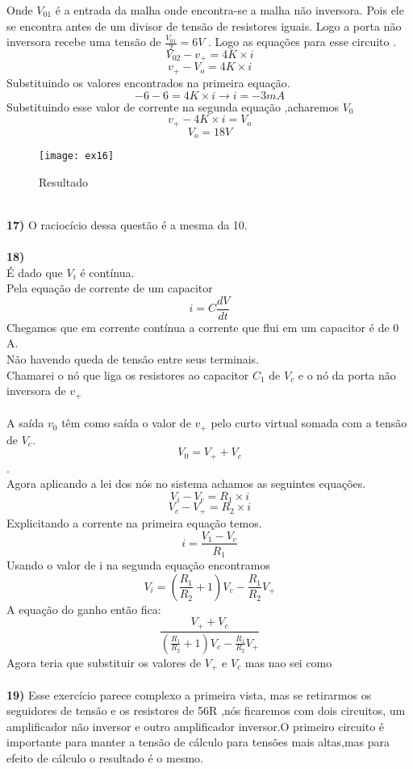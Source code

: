 \documentclass[11pt,a4paper]{article}
\begin{document}
Onde $V_{01}$ é a entrada da malha onde encontra-se a malha não inversora. Pois ele se encontra antes de um divisor de tensão de resistores iguais. Logo a porta não inversora recebe uma tensão de $\frac{V_{01}}{2}=6 V$ . Logo as equações para esse circuito .\\
$${V_02}-v_+=4K\times i$$
$$v_+-{V_o}=4K\times i$$
Substituindo os valores encontrados na primeira equação.\\
$$-6-6=4K\times i \rightarrow i=-3mA$$
Substituindo esse valor de corrente na segunda equação ,acharemos $V_0$\\
$$v_+-4K\times i={V_o}$$
$$V_o=18 V$$
\begin{figure}[!h]
\begin{center}
\texttt{[image: ex16]}
\caption{Resultado}
\end{center}
\end{figure}
\\
\newpage
\textbf{17) }O raciocício dessa questão é a mesma da 10.\\\\
\textbf{18) }\\
É dado que $V_i$ é contínua.\\
Pela equação de corrente de um capacitor 
$$i=C\frac{dV}{dt}$$
Chegamos que em corrente contínua a corrente que flui em um capacitor é de 0 A.\\
Não havendo queda de tensão entre seus terminais.\\
Chamarei o nó que liga os resistores ao capacitor $C_1$ de $V_c$ e o nó da porta não inversora de $v_+$\\\\
A saída $v_0$ têm como saída o valor de $v_+$ pelo curto virtual somada com a tensão de $V_c$. \\
$$V_0=V_+ + V_c$$ .\\
Agora aplicando a lei dos nós no sistema achamos as seguintes equações.\\
$$V_i-V_c=R_1\times i$$
$$V_c-V_+=R_2\times i$$
Explicitando a corrente na primeira equação temos.\\
$$i=\frac{V_1-V_c}{R_1}$$
Usando o valor de i na segunda equação encontramos 
$$V_i=\left( \frac{R_1}{R_2}+1  \right)V_c - \frac{R_1}{R_2}V_+$$
A equação do ganho então fica:
$$\frac{V_+ + V_c}{\left(\frac{R_1}{R_2}+1  \right)V_c - \frac{R_1}{R_2}V_+} $$
Agora teria que substituir os valores de $V_+$ e $V_c$ mas nao sei como
\\\\
\textbf{19) }
Esse exercício parece complexo a primeira vista, mas se retirarmos os seguidores de tensão e os resistores de 56R ,nós ficaremos com dois circuitos, um amplificador não inversor e outro amplificador inversor.O primeiro circuito é importante para manter a tensão de cálculo para tensões mais altas,mas para efeito de cálculo o resultado é o mesmo.\\\\
\end{document}

